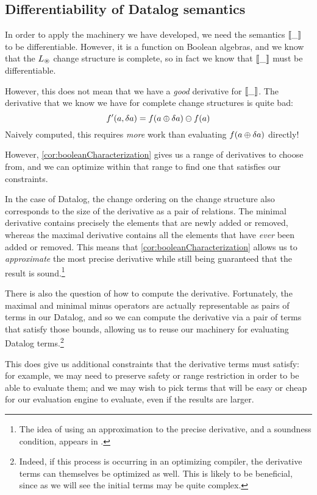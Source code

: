 \subsection{Differentiability of Datalog semantics}
\label{sec:datalogDifferentiability}

In order to apply the machinery we have developed, we need the semantics $\llbracket \_ \rrbracket$ to
be differentiable. However, it is a function on Boolean algebras, and we know
that the $L_\circledast$ change structure is complete, so in fact we know that
$\llbracket \_ \rrbracket$ must be differentiable.

However, this does not mean that we have a \emph{good} derivative for
$\llbracket \_ \rrbracket$. The derivative that we know we have for complete change structures
is quite bad:
$$f'(a, \delta a) = f(a \oplus \delta a) \ominus f(a)$$
Naively computed, this requires \emph{more} work than evaluating $f(a \oplus \delta a)$ directly!

However, \ref{cor:booleanCharacterization} gives us a range of derivatives to
choose from, and we can optimize within that range to find one that satisfies
our constraints.

In the case of Datalog, the change ordering on the change structure also
corresponds to the size of the derivative as a pair of relations. The minimal
derivative contains precisely the elements that are newly added or removed,
whereas the maximal derivative contains all the elements that have \emph{ever}
been added or removed. This means that \ref{cor:booleanCharacterization} allows
us to \emph{approximate} the most precise derivative while still being
guaranteed that the result is sound.\footnote{The idea of using an approximation
to the precise derivative, and a soundness condition, appears in \cite{bancilhon1986amateur}.}

There is also the question of how to compute the derivative. Fortunately, the
maximal and minimal minus operators are actually representable as pairs of terms
in our Datalog, and so we can compute the derivative via a pair of terms that
satisfy those bounds, allowing us to reuse our machinery for evaluating Datalog
terms.\footnote{Indeed, if this process is occurring in an optimizing compiler,
  the derivative terms can themselves be optimized as well. This is likely to be
  beneficial, since as we will see the initial terms may be quite complex.}

This does give us additional constraints that the derivative terms must satisfy:
for example, we may need to preserve safety or range restriction in order to be
able to evaluate them; and we may wish to pick terms that will be easy or cheap
for our evaluation engine to evaluate, even if the results are larger.

